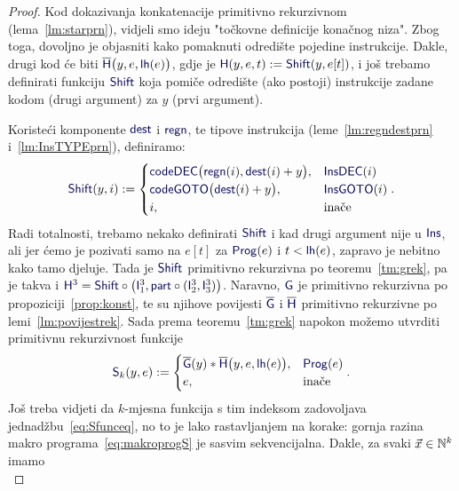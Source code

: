 \begin{proof}
Kod dokazivanja konkatenacije primitivno rekurzivnom (lema~\ref{lm:starprn}), vidjeli smo ideju "točkovne definicije konačnog niza". Zbog toga, dovoljno je objasniti kako pomaknuti odredište pojedine instrukcije. Dakle, drugi kod će biti $\overline{\f H}\bigl(y,e,\f{lh}(e)\bigr)$, gdje je $\f H(y,e,t):=\f{Shift}(y,e[t])$, i još trebamo definirati funkciju $\f{Shift}$ koja pomiče odredište (ako postoji) instrukcije zadane kodom (drugi argument) za $y$ (prvi argument).

Koristeći komponente $\f{dest}$ i $\f{regn}$, te tipove instrukcija (leme~\ref{lm:regndestprn} i~\ref{lm:InsTYPEprn}), definiramo:
\begin{equation}
    \f{Shift}(y,i):=\begin{cases}
        \f{codeDEC}\bigl(\f{regn}(i),\f{dest}(i)+y\bigr),&\f{InsDEC}(i)\\
        \f{codeGOTO}\bigl(\f{dest}(i)+y\bigr),&\f{InsGOTO}(i)\\
        i,&\text{inače}
    \end{cases}\text.
\end{equation}
Radi totalnosti, trebamo nekako definirati $\f{Shift}$ i kad drugi argument nije u $\f{Ins}$, ali jer ćemo je pozivati samo na $e[t]$ za $\f{Prog}(e)$ i $t<\f{lh}(e)$, zapravo je nebitno kako tamo djeluje. Tada je $\f{Shift}$ primitivno rekurzivna po teoremu~\ref{tm:grek}, pa je takva i $\f H^3=\f{Shift}\circ\bigl(\f I_1^3,\f{part}\circ(\f I_2^3,\f I_3^3)\bigr)$. Naravno, $\f G$ je primitivno rekurzivna po propoziciji~\ref{prop:konst}, te su njihove povijesti $\overline{\f G}$ i $\overline{\f H}$ primitivno rekurzivne po lemi~\ref{lm:povijestrek}. Sada prema teoremu~\ref{tm:grek} napokon možemo utvrditi primitivnu rekurzivnost funkcije
\begin{equation}\label{eq:Skprn}
    \f S_k(y,e):=\begin{cases}
        \overline{\f G}(y)*\overline{\f H}\bigl(y,e,\f{lh}(e)\bigr),&\f{Prog}(e)\\
        e,&\text{inače}
    \end{cases}\text.
\end{equation}
Još treba vidjeti da $k$-mjesna funkcija s tim indeksom zadovoljava jednadžbu~\eqref{eq:Sfunceq}, no to je lako rastavljanjem na korake: gornja razina makro programa~\eqref{eq:makroprogS} je sasvim sekvencijalna. Dakle, za svaki $\vec x\in{\mathbb N}^k$ imamo
\begin{equation}

\end{equation}
\end{proof}
